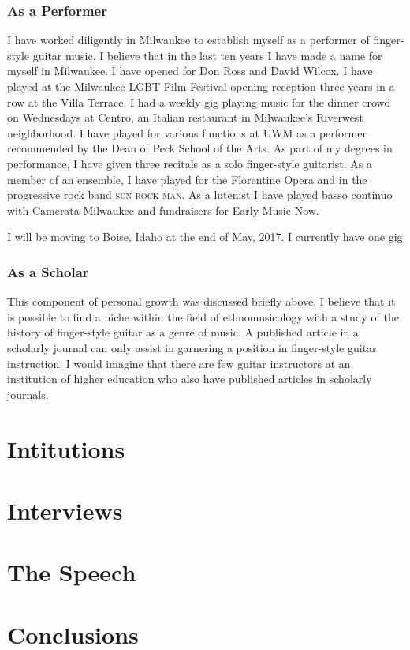 \documentclass[12pt]{article}
\begin{document}
\subsubsection{As a Performer}
\label{sec:performer}
I have worked diligently in Milwaukee to establish myself as a
performer of finger-style guitar music. I believe that in the last ten
years I have made a name for myself in Milwaukee. I have opened for
Don Ross and David Wilcox. I have played at the Milwaukee LGBT Film
Festival opening reception three years in a row at the Villa
Terrace. I had a weekly gig playing music for the dinner crowd on
Wednesdays at Centro, an Italian restaurant in Milwaukee's Riverwest
neighborhood. I have played for various functions at UWM as a
performer recommended by the Dean of Peck School of the Arts. As part
of my degrees in performance, I have given three recitals as a solo
finger-style guitarist. As a member of an ensemble, I have played for
the Florentine Opera and in the progressive rock band \textsc{sun rock
  man}. As a lutenist I have played basso continuo with Camerata
Milwaukee and fundraisers for Early Music Now.

I will be moving to Boise, Idaho at the end of May, 2017. I currently have one gig
\subsubsection{As a Scholar}
\label{sec:scholar}
This component of personal growth was discussed briefly above. I
believe that it is possible to find a niche within the field of
ethnomusicology with a study of the history of finger-style guitar as
a genre of music. A published article in a scholarly journal can only
assist in garnering a position in finger-style guitar instruction. I
would imagine that there are few guitar instructors at an institution
of higher education who also have published articles in scholarly
journals. 
\section{Intitutions}
\label{sec:intitutions}

\section{Interviews}
\label{sec:interviews}

\section{The Speech}
\label{sec:speech}

\section{Conclusions}
\label{sec:conclusions}

\clearpage
\printbibliography
\end{document}
